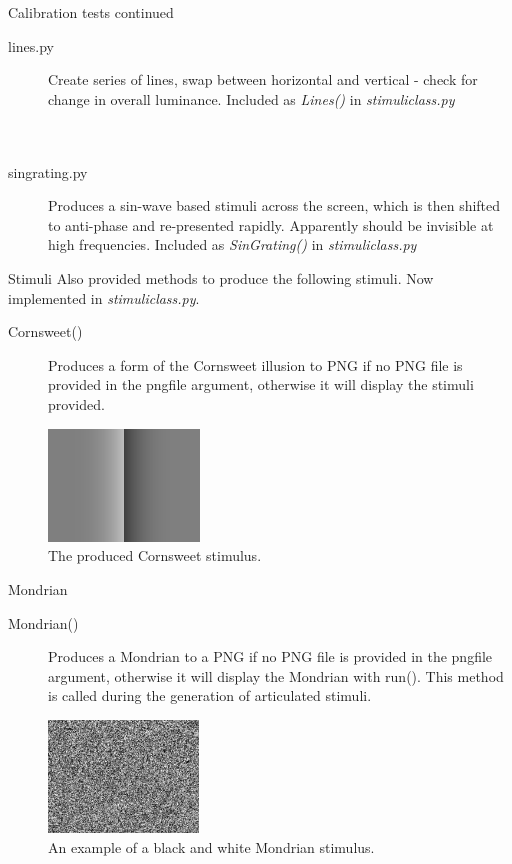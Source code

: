 \documentclass{beamer}
\begin{document}
\begin{frame}[t]{Calibration tests continued}
\begin{description}
\item[lines.py] Create series of lines, swap between horizontal and vertical - check for change in overall luminance. Included as {\it Lines()} in {\it stimuliclass.py} \\
~\\
~\\
\item[singrating.py] Produces a sin-wave based stimuli across the screen, which is then shifted to anti-phase and re-presented rapidly. Apparently should be invisible at high frequencies. Included as {\it SinGrating()} in {\it stimuliclass.py}
\end{description}

\end{frame}
\begin{frame}[t]{Stimuli}
Also provided methods to produce the following stimuli. Now implemented in {\it stimuliclass.py}.
\begin{description}
\item[Cornsweet()] Produces a form of the Cornsweet illusion to PNG if no PNG file is provided in the pngfile argument, otherwise it will display the stimuli provided.

\end{description}
\begin{figure}[c]
\includegraphics[height=3cm]{cornsweet20120814_1705.png}
\caption{The produced Cornsweet stimulus.}
\end{figure}


\end{frame}
\begin{frame}[t]{Mondrian}
\begin{description}
\item[Mondrian()] Produces a Mondrian to a PNG if no PNG file is provided in the pngfile argument, otherwise it will display the Mondrian with run(). This method is called during the generation of articulated stimuli.
\end{description}
\begin{figure}[c]
\includegraphics[height=3cm]{mondrian20120713_1126.png}
\caption{An example of a black and white Mondrian stimulus.}
\end{figure}
\end{frame}
\end{document}

